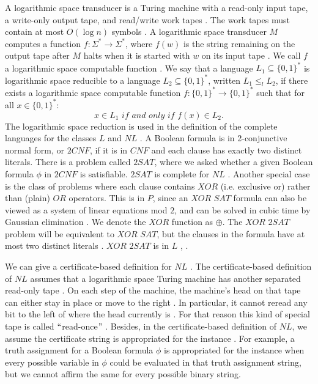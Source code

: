 \documentclass[a4paper,UKenglish,cleveref, autoref]{lipics-v2019}
\begin{document}
A logarithmic space transducer is a Turing machine with a read-only input tape, a write-only output tape, and read/write work tapes \cite{MS06}. The work tapes must contain at most $O(\log n)$ symbols \cite{MS06}. A logarithmic space transducer $M$ computes a function $f : \Sigma^{*} \rightarrow \Sigma^{*}$, where $f(w)$ is the string remaining on the output tape after $M$ halts when it is started with $w$ on its input tape \cite{MS06}. We call $f$ a logarithmic space computable function \cite{MS06}. We say that a language $L_{1} \subseteq \{0, 1\}^{*}$ is logarithmic space reducible to a language $L_{2} \subseteq \{0, 1\}^{*}$, written $L_{1} \leq_{l} L_{2}$, if there exists a logarithmic space computable function $f : \{0, 1\}^{*} \rightarrow \{0, 1\}^{*}$ such that for all $x \in \{0, 1\}^{*}$:
\[x \in L_{1} \textit{ if and only if } f(x) \in L_{2}.\]
The logarithmic space reduction is used in the definition of the complete languages for the classes $L$ and $NL$ \cite{Pap03}. A Boolean formula is in 2-conjunctive normal form, or $2CNF$, if it is in $CNF$ and each clause has exactly two distinct literals. There is a problem called $2SAT$, where we asked whether a given Boolean formula $\phi$ in $2CNF$ is satisfiable. $2SAT$ is complete for $NL$ \cite{Pap03}. Another special case is the class of problems where each clause contains $XOR$ (i.e. exclusive or) rather than (plain) $OR$ operators. This is in $P$, since an $\textit{XOR SAT}$ formula can also be viewed as a system of linear equations mod $2$, and can be solved in cubic time by Gaussian elimination \cite{MM11}. We denote the $XOR$ function as $\oplus$. The $\textit{XOR 2SAT}$ problem will be equivalent to $\textit{XOR SAT}$, but the clauses in the formula have at most two distinct literals \cite{AR00}. $\textit{XOR 2SAT}$ is in $L$ \cite{AR00}, \cite{RM08}.

We can give a certificate-based definition for $NL$ \cite{AB09}. The certificate-based definition of $NL$ assumes that a logarithmic space Turing machine has another separated read-only tape \cite{AB09}. On each step of the machine, the machine's head on that tape can either stay in place or move to the right \cite{AB09}. In particular, it cannot reread any bit to the left of where the head currently is \cite{AB09}. For that reason this kind of special tape is called $``$read-once$"$ \cite{AB09}. Besides, in the certificate-based definition of $NL$, we assume the certificate string is appropriated for the instance \cite{Pap03}. For example, a truth assignment for a Boolean formula $\phi$ is appropriated for the instance when every possible variable in $\phi$ could be evaluated in that truth assignment string, but we cannot affirm the same for every possible binary string.
\end{document}
